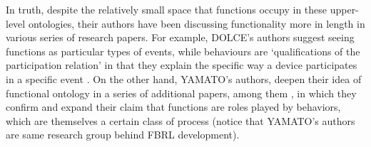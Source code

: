 \documentclass[sw]{iosart2x}
\newcommand{\DOLCE}{\textsc{DOLCE}\xspace} %
\newcommand{\YAMATO}{\textsc{YAMATO}\xspace}
\begin{document}
In truth, despite the relatively small space that functions occupy in these upper-level ontologies, their authors have been discussing functionality more in length in various series of research papers. 
For example, \DOLCE's authors suggest seeing functions as particular types of events, while behaviours are `qualifications of the participation relation' in that they explain the specific way a device participates in a specific event \cite{borgoCapabilitiesCapacitiesFunctionalities2021,borgoFormalizationFunctionsOperations2011, garbaczTwoOntologydrivenFormalisations2011}. %
On the other hand, \YAMATO's authors, deepen their idea of functional ontology in a series of additional papers, among them \cite{kitamuraOntologicalModelDevice2006, kitamuraCharacterizingFunctionsBased2013, mizoguchiFunctionalOntologyArtifacts2009}, in which they confirm and expand their claim that functions are roles played by behaviors, which are themselves a certain class of process (notice that \YAMATO's authors are same research group behind FBRL development).
\end{document}

